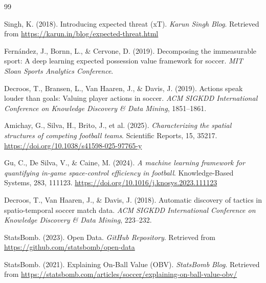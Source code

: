 \documentclass[12pt,a4paper]{article}
\begin{document}
\begin{thebibliography}{99}

Singh, K. (2018). Introducing expected threat (xT). \textit{Karun Singh Blog}. Retrieved from \url{https://karun.in/blog/expected-threat.html}

Fernández, J., Bornn, L., \& Cervone, D. (2019). Decomposing the immeasurable sport: A deep learning expected possession value framework for soccer. \textit{MIT Sloan Sports Analytics Conference}.

Decroos, T., Bransen, L., Van Haaren, J., \& Davis, J. (2019). Actions speak louder than goals: Valuing player actions in soccer. \textit{ACM SIGKDD International Conference on Knowledge Discovery \& Data Mining}, 1851--1861.

Amichay, G., Silva, H., Brito, J., et al. (2025). \textit{Characterizing the spatial structures of competing football teams}. Scientific Reports, 15, 35217. \url{https://doi.org/10.1038/s41598-025-97765-y}

Gu, C., De Silva, V., \& Caine, M. (2024). \textit{A machine learning framework for quantifying in-game space-control efficiency in football}. Knowledge-Based Systems, 283, 111123. \url{https://doi.org/10.1016/j.knosys.2023.111123}

Decroos, T., Van Haaren, J., \& Davis, J. (2018). Automatic discovery of tactics in spatio-temporal soccer match data. \textit{ACM SIGKDD International Conference on Knowledge Discovery \& Data Mining}, 223--232.

StatsBomb. (2023). Open Data. \textit{GitHub Repository}. Retrieved from \url{https://github.com/statsbomb/open-data}

StatsBomb. (2021). Explaining On-Ball Value (OBV). \textit{StatsBomb Blog}. Retrieved from \url{https://statsbomb.com/articles/soccer/explaining-on-ball-value-obv/}

\end{thebibliography}
\end{document}

